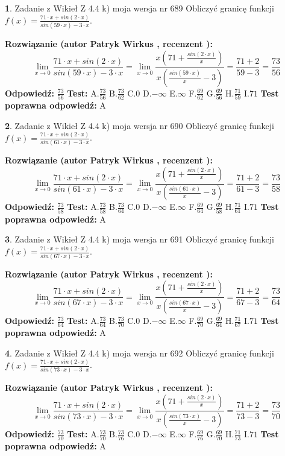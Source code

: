 \documentclass[12pt, a4paper]{article}
\theoremstyle{definition} %
\newtheorem{zad}{}
\newcommand{\zadStart}[1]{\begin{zad}#1\newline}
\newcommand{\zadStop}{\end{zad}}
\newcommand{\rozwStart}[2]{\noindent \textbf{Rozwiązanie (autor #1 , recenzent #2): }\newline}
\newcommand{\rozwStop}{\newline}
\newcommand{\odpStart}{\noindent \textbf{Odpowiedź:}\newline}
\newcommand{\odpStop}{\newline}
\newcommand{\testStart}{\noindent \textbf{Test:}\newline}
\newcommand{\testStop}{\newline}
\newcommand{\kluczStart}{\noindent \textbf{Test poprawna odpowiedź:}\newline}
\newcommand{\kluczStop}{\newline}
\begin{document}
\zadStart{Zadanie z Wikieł Z 4.4 k) moja wersja nr 689}
Obliczyć granicę funkcji $f(x)=\frac{71\cdot x +sin(2\cdot x)}{sin(59\cdot x) -3\cdot x}$.
\zadStop
\rozwStart{Patryk Wirkus}{}
$$\lim\limits_{x\to 0}\frac{71\cdot x +sin(2\cdot x)}{sin(59\cdot x) -3\cdot x}
=\lim\limits_{x\to 0}\frac{x(71+\frac{sin(2\cdot x)}{x})}{x(\frac{sin(59\cdot x)}{x}-3)}
=\frac{71+2}{59-3} = \frac{73}{56}$$
\rozwStop
\odpStart
$\frac{73}{56}$
\odpStop
\testStart
A.$\frac{73}{56}$
B.$\frac{73}{62}$
C.$0$
D.$-\infty$
E.$\infty$
F.$\frac{69}{62}$
G.$\frac{69}{56}$
H.$\frac{71}{59}$
I.$71$
\testStop
\kluczStart
A
\kluczStop



\zadStart{Zadanie z Wikieł Z 4.4 k) moja wersja nr 690}
Obliczyć granicę funkcji $f(x)=\frac{71\cdot x +sin(2\cdot x)}{sin(61\cdot x) -3\cdot x}$.
\zadStop
\rozwStart{Patryk Wirkus}{}
$$\lim\limits_{x\to 0}\frac{71\cdot x +sin(2\cdot x)}{sin(61\cdot x) -3\cdot x}
=\lim\limits_{x\to 0}\frac{x(71+\frac{sin(2\cdot x)}{x})}{x(\frac{sin(61\cdot x)}{x}-3)}
=\frac{71+2}{61-3} = \frac{73}{58}$$
\rozwStop
\odpStart
$\frac{73}{58}$
\odpStop
\testStart
A.$\frac{73}{58}$
B.$\frac{73}{64}$
C.$0$
D.$-\infty$
E.$\infty$
F.$\frac{69}{64}$
G.$\frac{69}{58}$
H.$\frac{71}{61}$
I.$71$
\testStop
\kluczStart
A
\kluczStop



\zadStart{Zadanie z Wikieł Z 4.4 k) moja wersja nr 691}
Obliczyć granicę funkcji $f(x)=\frac{71\cdot x +sin(2\cdot x)}{sin(67\cdot x) -3\cdot x}$.
\zadStop
\rozwStart{Patryk Wirkus}{}
$$\lim\limits_{x\to 0}\frac{71\cdot x +sin(2\cdot x)}{sin(67\cdot x) -3\cdot x}
=\lim\limits_{x\to 0}\frac{x(71+\frac{sin(2\cdot x)}{x})}{x(\frac{sin(67\cdot x)}{x}-3)}
=\frac{71+2}{67-3} = \frac{73}{64}$$
\rozwStop
\odpStart
$\frac{73}{64}$
\odpStop
\testStart
A.$\frac{73}{64}$
B.$\frac{73}{70}$
C.$0$
D.$-\infty$
E.$\infty$
F.$\frac{69}{70}$
G.$\frac{69}{64}$
H.$\frac{71}{67}$
I.$71$
\testStop
\kluczStart
A
\kluczStop



\zadStart{Zadanie z Wikieł Z 4.4 k) moja wersja nr 692}
Obliczyć granicę funkcji $f(x)=\frac{71\cdot x +sin(2\cdot x)}{sin(73\cdot x) -3\cdot x}$.
\zadStop
\rozwStart{Patryk Wirkus}{}
$$\lim\limits_{x\to 0}\frac{71\cdot x +sin(2\cdot x)}{sin(73\cdot x) -3\cdot x}
=\lim\limits_{x\to 0}\frac{x(71+\frac{sin(2\cdot x)}{x})}{x(\frac{sin(73\cdot x)}{x}-3)}
=\frac{71+2}{73-3} = \frac{73}{70}$$
\rozwStop
\odpStart
$\frac{73}{70}$
\odpStop
\testStart
A.$\frac{73}{70}$
B.$\frac{73}{76}$
C.$0$
D.$-\infty$
E.$\infty$
F.$\frac{69}{76}$
G.$\frac{69}{70}$
H.$\frac{71}{73}$
I.$71$
\testStop
\kluczStart
A
\kluczStop
\end{document}
